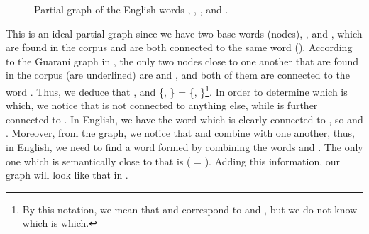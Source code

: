\begin{refsection}
\begin{mysolution}


\begin{figure}[H]
\caption{Partial graph of the English words , , , and .}
\label{fig:Guarani-step2}
\end{figure}



 This is an ideal partial graph since we have two base words (nodes), , and , which are found in the corpus and are both connected to the same word (). According to the Guaraní graph in , the only two nodes close to one another that are found in the corpus (are underlined) are  and , and both of them are connected to the word . Thus, we deduce that , and \{, \} = \{, \}\footnote{By this notation, we mean that  and  correspond to  and , but we do not know which is which.}. In order to determine which is which, we notice that  is not connected to anything else, while  is further connected to . In English, we have the word  which is clearly connected to , so  and . Moreover, from the graph, we notice that  and  combine with one another, thus, in English, we need to find a word formed by combining the words  and . The only one which is semantically close to that is  ( = ). Adding this information, our graph will look like that in .


\end{mysolution}
\end{refsection}
